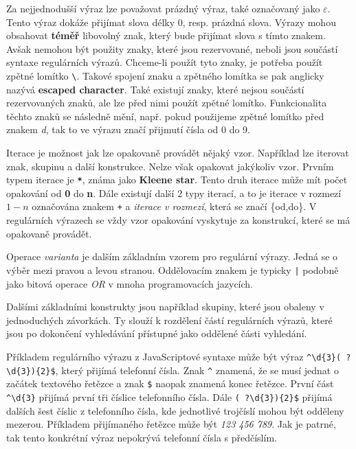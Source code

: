 Za nejjednodušší výraz lze považovat prázdný výraz, také označovaný jako $\varepsilon$. 
Tento výraz dokáže přijímat slova délky 0, resp. prázdná slova.
Výrazy mohou obsahovat \textbf{téměř} libovolný znak, který bude přijímat slova s tímto znakem. 
Avšak nemohou být použity znaky, které jsou rezervované, neboli jsou součástí syntaxe regulárních výrazů.
Chceme-li použít tyto znaky, je potřeba použít zpětné lomítko \texttt{\textbackslash}. 
Takové spojení znaku a zpětného lomítka se pak anglicky nazývá \textbf{escaped character}.
Také existují znaky, které nejsou součástí rezervovaných znaků, ale lze před nimi použít zpětné lomítko.
Funkcionalita těchto znaků se následně mění, např. pokud použijeme zpětné lomítko před znakem \textit{d}, tak to ve výrazu značí přijmutí čísla od 0 do 9.

Iterace je možnost jak lze opakovaně provádět nějaký vzor.
Například lze iterovat znak, skupinu a další konstrukce. 
Nelze však opakovat jakýkoliv vzor.
Prvním typem iterace je \texttt{\textbf{*}}, známa jako \textbf{Kleene star}.
Tento druh iterace může mít počet opakování od \textbf{0} do \textbf{n}. 
Dále existují další 2 typy iterací, a to je iterace v rozmezí $1-n$ označována znakem \texttt{+} a \textit{iterace v rozmezí}, která se značí \{od,do\}.
V regulárních výrazech se vždy vzor opakování vyskytuje za konstrukcí, které se má opakovaně provádět.

Operace \textit{varianta} je dalším základním vzorem pro regulární výrazy. 
Jedná se o výběr mezi pravou a levou stranou. 
Oddělovacím znakem je typicky \texttt{|} podobně jako bitová operace \textit{OR} v mnoha programovacích jazycích.

Dalšími základními konstrukty jsou například skupiny, které jsou obaleny v jednoduchých závorkách.
Ty slouží k rozdělení částí regulárních výrazů, které jsou po dokončení vyhledávání přístupné jako oddělené části vyhledání.

Příkladem regulárního výrazu z JavaScriptové syntaxe může být výraz \texttt{\textasciicircum \textbackslash d\{3\}(~?\textbackslash d\{3\})\{2\}\$}, který přijímá telefonní čísla.
Znak \texttt{\textasciicircum} znamená, že se musí jednat o začátek textového řetězce a znak \texttt{\$} naopak znamená konec řetězce. 
První část \texttt{\textasciicircum \textbackslash d\{3\}} přijímá první tři číslice telefonního čísla.
Dále \texttt{(~?\textbackslash d\{3\})\{2\}\$} přijímá dalších šest číslic z telefonního čísla, kde jednotlivé trojčíslí mohou být odděleny mezerou.
Příkladem přijímaného řetězce může být \textit{123 456 789}.
Jak je patrné, tak tento konkrétní výraz nepokrývá telefonní čísla s předčíslím.

